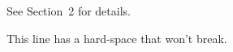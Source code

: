\documentclass{article}
\begin{document}
See Section~2 for details.

This line has a hard-space that won't break.
\end{document}
